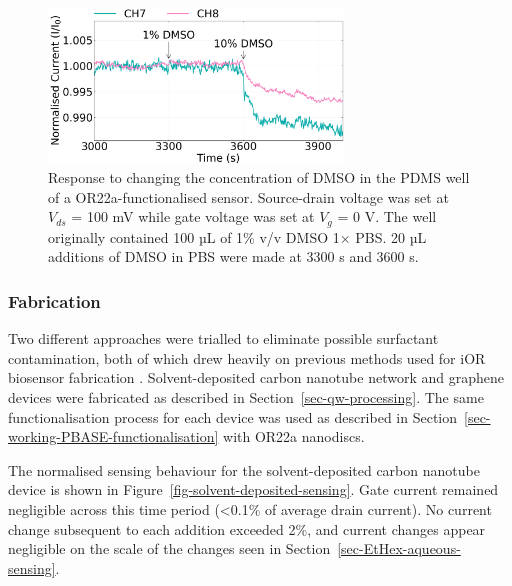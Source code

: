 \documentclass[
  a4paper,
]{scrbook}
\begin{document}
\begin{figure}

{\centering \includegraphics[width=0.7\textwidth,height=\textheight]{figures/ch7/NGW4_D7_OR22aliposome_sampling_220623_detrend_trunc_arrows_normalised.png}

}

\caption[Response to changing the concentration of DMSO in the PDMS well
of a OR22a-functionalised
sensor.]{\label{fig-DMSO-concentration}Response to changing the
concentration of DMSO in the PDMS well of a OR22a-functionalised sensor.
Source-drain voltage was set at \(V_{ds}\) = 100 mV while gate voltage
was set at \(V_g\) = 0 V. The well originally contained 100 µL of 1\%
v/v DMSO 1× PBS. 20 µL additions of DMSO in PBS were made at 3300 s and
3600 s.}

\end{figure}

\hypertarget{fabrication}{%
\subsubsection*{Fabrication}\label{fabrication}}

Two different approaches were trialled to eliminate possible surfactant
contamination, both of which drew heavily on previous methods used for
iOR biosensor fabrication \autocite{Murugathas2019a,Murugathas2020}.
Solvent-deposited carbon nanotube network and graphene devices were
fabricated as described in Section~\ref{sec-qw-processing}. The same
functionalisation process for each device was used as described in
Section~\ref{sec-working-PBASE-functionalisation} with OR22a nanodiscs.

The normalised sensing behaviour for the solvent-deposited carbon
nanotube device is shown in Figure~\ref{fig-solvent-deposited-sensing}.
Gate current remained negligible across this time period (\textless0.1\%
of average drain current). No current change subsequent to each addition
exceeded 2\%, and current changes appear negligible on the scale of the
changes seen in Section~\ref{sec-EtHex-aqueous-sensing}.
\end{document}
